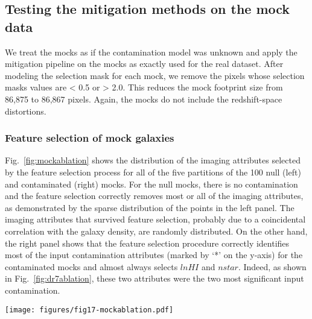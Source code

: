 \subsection{Testing the mitigation methods on the mock data}
We treat the mocks as if the contamination model was unknown and apply the mitigation pipeline on the mocks as exactly used for the real dataset. After modeling the selection mask for each mock, we remove the pixels whose selection masks values are < 0.5 or > 2.0. This reduces the mock footprint size from 86,875 to 86,867 pixels. Again, the mocks do not include the redshift-space distortions.

\subsubsection{Feature selection of mock galaxies}
Fig.~\ref{fig:mockablation} shows the distribution of the imaging attributes selected by the feature selection process for all of the five partitions of the 100 null (left) and contaminated (right) mocks. For the null mocks, there is no contamination and the feature selection correctly removes most or all of the imaging attributes, as demonstrated by the sparse distribution of the points in the left panel. The imaging attributes that survived feature selection, probably due to a coincidental correlation with the galaxy density, are randomly distributed. On the other hand, the right panel shows that the feature selection procedure correctly identifies most of the input contamination attributes (marked by `*' on the y-axis) for the contaminated mocks and almost always selects $lnHI$ and $nstar$. Indeed, as shown in Fig.~\ref{fig:dr7ablation}, these two attributes were the two most significant input contamination.

\begin{figure*}
    \centering
    \texttt{[image: figures/fig17-mockablation.pdf]}
    \caption{Important imaging maps identified in the mocks by the feature selection procedure for the five partitions of the 100 null (left) and contaminated mocks (right). The maps used in the input contamination model were marked by `*'. The right panel shows that the feature selection procedure has identified EBV, Stellar density, skymag-g, seeing-g as important in most of the contaminated realizations whereas in the left panel, no map is consistently selected as important among all of the 100 null mocks.}
    \label{fig:mockablation}
\end{figure*}

